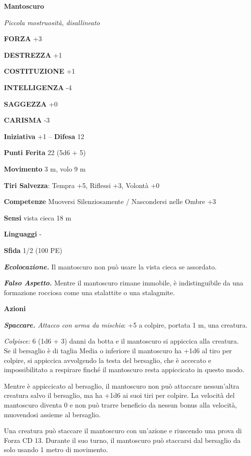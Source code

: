 \begin{multicols}{2}
\medskip{}\textbf{Mantoscuro}

\emph{Piccola mostruosità, disallineato}

\textbf{FORZA} +3

\textbf{DESTREZZA} +1

\textbf{COSTITUZIONE} +1

\textbf{INTELLIGENZA} -4

\textbf{SAGGEZZA} +0

\textbf{CARISMA} -3

\textbf{Iniziativa} +1 -- \textbf{Difesa} 12

\textbf{Punti Ferita} 22 (5d6 + 5)

\textbf{Movimento} 3 m, volo 9 m

\textbf{Tiri Salvezza}: Tempra +5, Riflessi +3, Volontà +0

\textbf{Competenze} Muoversi Silenziosamente / Nascondersi nelle Ombre +3

\textbf{Sensi} vista cieca 18 m

\textbf{Linguaggi} -

\textbf{Sfida} 1/2 (100 PE)

\emph{\textbf{Ecolocazione.}} Il mantoscuro non può usare la vista cieca se assordato.

\emph{\textbf{Falso Aspetto.}} Mentre il mantoscuro rimane immobile, è indistinguibile da una formazione rocciosa come una stalattite o una stalagmite.

\textbf{Azioni}

\emph{\textbf{Spaccare.} Attacco con arma da mischia}: +5 a colpire, portata 1 m, una creatura.

\emph{Colpisce:} 6 (1d6 + 3) danni da botta e il mantoscuro si appiccica alla creatura. Se il bersaglio è di taglia Media o inferiore il mantoscuro ha +1d6 al tiro per colpire, si appiccica avvolgendo la testa del bersaglio, che è accecato e impossibilitato a respirare finché il mantoscuro resta appiccicato in questo modo.

Mentre è appiccicato al bersaglio, il mantoscuro non può attaccare nessun'altra creatura salvo il bersaglio, ma ha +1d6 ai suoi tiri per colpire. La velocità del mantoscuro diventa 0 e non può trarre beneficio da nessun bonus alla velocità, muovendosi assieme al bersaglio.

Una creatura può staccare il mantoscuro con un'azione e riuscendo una
prova di Forza CD 13. Durante il suo turno, il mantoscuro può staccarsi
dal bersaglio da solo usando 1 metro di movimento.


\end{multicols}
